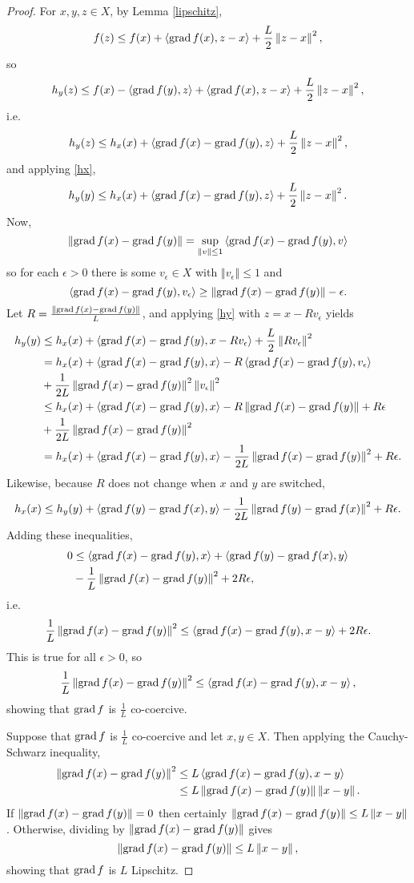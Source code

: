 \documentclass{article}
\newcommand{\inner}[2]{\left\langle #1, #2 \right\rangle}
\newcommand{\grad}{\ensuremath\mathrm{grad}\,}
\newcommand{\norm}[1]{\left\Vert #1 \right\Vert}
\theoremstyle{definition}
\theoremstyle{definition}
\begin{document}
\begin{proof}
For $x,y,z \in X$,
by Lemma \ref{lipschitz},
\[
f(z) \leq f(x)+\inner{\grad f(x)}{z-x} + \frac{L}{2} \norm{z-x}^2,
\]
so
\[
h_y(z) \leq f(x)-\inner{\grad f(y)}{z} +\inner{\grad f(x)}{z-x} + \frac{L}{2} \norm{z-x}^2,
\]
i.e.
\[
h_y(z) \leq h_x(x)+\inner{\grad f(x)-\grad f(y)}{z}+\frac{L}{2}\norm{z-x}^2,
\]
and applying \eqref{hx},
\begin{equation}
h_y(y) \leq h_x(x) +\inner{\grad f(x)-\grad f(y)}{z}+\frac{L}{2}\norm{z-x}^2.
\label{hy}
\end{equation}
Now,
\[
\norm{\grad f(x)-\grad f(y)} = \sup_{\norm{v} \leq 1} \inner{\grad f(x)-\grad f(y)}{v}
\]
so for each $\epsilon>0$ there is some $v_\epsilon \in X$ with $\norm{v_\epsilon} \leq 1$ and
\[
 \inner{\grad f(x)-\grad f(y)}{v_\epsilon} \geq 
\norm{\grad f(x)-\grad f(y)} -\epsilon.
\]
Let $R=\frac{\norm{\grad f(x)-\grad f(y)}}{L}$, and applying \eqref{hy} with  $z=x-Rv_\epsilon$  yields
\begin{align*}
h_y(y) &\leq h_x(x) + \inner{\grad f(x)-\grad f(y)}{x-Rv_\epsilon} +\frac{L}{2}\norm{Rv_\epsilon}^2\\
&=h_x(x)+\inner{\grad f(x)-\grad f(y)}{x} - R \inner{\grad f(x)-\grad f(y)}{v_\epsilon}\\
&+\frac{1}{2L} \norm{\grad f(x)-\grad f(y)}^2 \norm{v_\epsilon}^2\\
&\leq h_x(x)+\inner{\grad f(x)-\grad f(y)}{x} -R\norm{\grad f(x)-\grad f(y)} + R\epsilon\\
&+\frac{1}{2L} \norm{\grad f(x)-\grad f(y)}^2\\
&=h_x(x)+\inner{\grad f(x)-\grad f(y)}{x}  - \frac{1}{2L} \norm{\grad f(x)-\grad f(y)}^2 + R\epsilon.
\end{align*}
Likewise, because $R$ does not change when $x$ and $y$ are switched,
\[
h_x(x) \leq h_y(y)+\inner{\grad f(y)-\grad f(x)}{y}  - \frac{1}{2L} \norm{\grad f(y)-\grad f(x)}^2 + R\epsilon.
\]
Adding these inequalities,
\begin{align*}
0 &\leq \inner{\grad f(x)-\grad f(y)}{x} + \inner{\grad f(y)-\grad f(x)}{y} \\
&- \frac{1}{L} \norm{\grad f(x)-\grad f(y)}^2+2R\epsilon,
\end{align*}
i.e.
\[
\frac{1}{L} \norm{\grad f(x)-\grad f(y)}^2 \leq  \inner{\grad f(x)-\grad f(y)}{x-y} +2R\epsilon.
\]
This is true for all $\epsilon>0$, so
\[
\frac{1}{L} \norm{\grad f(x)-\grad f(y)}^2 \leq  \inner{\grad f(x)-\grad f(y)}{x-y},
\]
showing that $\grad f$ is $\frac{1}{L}$ co-coercive.

Suppose that $\grad f$ is $\frac{1}{L}$ co-coercive and let $x,y \in X$. Then applying the Cauchy-Schwarz inequality,
\begin{align*}
\norm{\grad f(x)-\grad f(y)}^2 &\leq L \inner{\grad f(x)-\grad f(y)}{x-y}\\
&\leq L \norm{\grad f(x)-\grad f(y)} \norm{x-y}.
\end{align*}
If $\norm{\grad f(x)-\grad f(y)}=0$ then certainly $\norm{\grad f(x)-\grad f(y)} \leq L \norm{x-y}$. Otherwise, dividing by
$\norm{\grad f(x)-\grad f(y)}$ gives
\[
\norm{\grad f(x)-\grad f(y)} \leq L \norm{x-y},
\]
showing that $\grad f$ is $L$ Lipschitz.
\end{proof}
\end{document}
